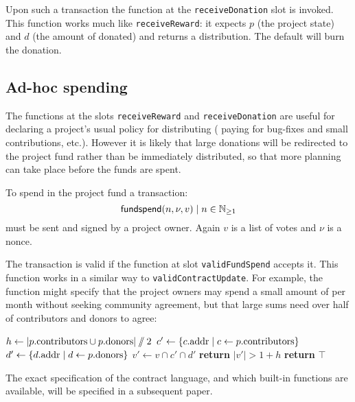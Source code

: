Upon such a transaction the function at the \texttt{receiveDonation} slot is
invoked. This function works much like \texttt{receiveReward}: it expects $p$
(the project state) and $d$ (the amount of \oscoin{} donated) and returns a
distribution. The default will burn the donation.

\subsection{Ad-hoc spending}

The functions at the slots \texttt{receiveReward} and \texttt{receiveDonation}
are useful for declaring a project's usual policy for distributing \oscoin{}
(\eg{} paying for bug-fixes and small contributions, etc.). However it is likely
that large donations will be redirected to the project fund rather than be
immediately distributed, so that more planning can take place before the funds
are spent.

To spend \oscoin{} in the project fund a transaction:
\[
\mathsf{fundspend}\lparen n, \nu, v\rparen \mid n \in \mathbb{N}_{\geq 1}
\]
must be sent and signed by a project owner. Again $v$ is a list of votes and
$\nu$ is a nonce.

The transaction is valid if the function at slot \texttt{validFundSpend} accepts
it. This function works in a similar way to \texttt{validContractUpdate}. For
example, the function might specify that the project owners may spend a small
amount of \oscoin{} per month without seeking community agreement, but that
large sums need over half of contributors and donors to agree:
\begin{algorithmic}[0]
            \State $h \gets |p.{\mathrm{contributors}} \cup p.{\mathrm{donors}}| \sslash 2$
            \State $c' \gets \{ c.{\mathrm{addr}} \mid c \gets p.{\mathrm{contributors}} \}$
            \State $d' \gets \{ d.{\mathrm{addr}} \mid d \gets p.{\mathrm{donors}} \}$
            \State $v' \gets v \cap c' \cap d'$
            \State \textbf{return} $|v'| > 1 + h$
            \Else
            \State \textbf{return} $\top$
        \EndIf
    \EndProcedure
\end{algorithmic}

The exact specification of the contract language, and which built-in functions
are available, will be specified in a subsequent paper.
